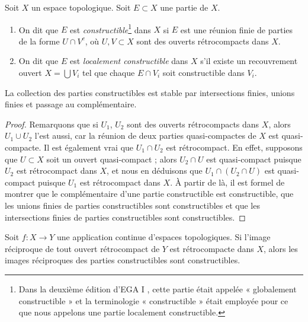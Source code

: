 \begin{definition}
\label{definition-constructible}
Soit $X$ un espace topologique. Soit $E \subset X$ une partie de $X$.
\begin{enumerate}
\item On dit que $E$ est {\it constructible}\footnote{Dans la deuxième édition
d'EGA I \cite{EGA1-second}, cette partie était appelée « globalement
constructible » et la terminologie « constructible » était employée pour ce
que nous appelons une partie localement constructible.}
dans $X$ si $E$ est une réunion finie
de parties de la forme $U \cap V^c$, où $U, V \subset X$ sont des ouverts
rétrocompacts dans $X$.
\item On dit que $E$ est {\it localement constructible} dans $X$ s'il existe un
recouvrement ouvert $X = \bigcup V_i$ tel que chaque $E \cap V_i$ soit
constructible dans $V_i$.
\end{enumerate}
\end{definition}

\begin{lemma}
\label{lemma-constructible}
La collection des parties constructibles est stable par
intersections finies, unions finies et passage au complémentaire.
\end{lemma}

\begin{proof}
Remarquons que si $U_1$, $U_2$ sont des ouverts rétrocompacts dans $X$,
alors $U_1 \cup U_2$ l'est aussi, car la réunion de deux parties
quasi-compactes de $X$ est quasi-compacte. Il est également vrai que
$U_1 \cap U_2$ est rétrocompact. En effet, supposons que $U \subset X$
soit un ouvert quasi-compact ; alors $U_2 \cap U$ est quasi-compact puisque
$U_2$ est rétrocompact dans $X$, et nous en déduisons que
$U_1 \cap (U_2 \cap U)$ est quasi-compact puisque $U_1$ est
rétrocompact dans $X$. À partir de là, il est formel de montrer que
le complémentaire d'une partie constructible est constructible,
que les unions finies de parties constructibles sont constructibles et
que les intersections finies de parties constructibles sont constructibles.
\end{proof}

\begin{lemma}
\label{lemma-inverse-images-constructibles}
Soit $f : X \to Y$ une application continue d'espaces topologiques.
Si l'image réciproque de tout ouvert rétrocompact de $Y$
est rétrocompacte dans $X$, alors les images réciproques des parties
constructibles sont constructibles.
\end{lemma}

